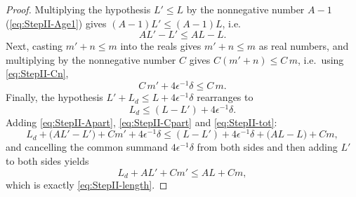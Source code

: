 \begin{proof}
  Multiplying the hypothesis $L'\le L$ by the nonnegative number $A-1$
  (\eqref{eq:StepII-Age1}) gives $(A-1)L' \le (A-1)L$, i.e.
  \begin{equation}
    \label{eq:StepII-Apart}
    A L' - L' \le A L - L
    .
  \end{equation}
  Next, casting $m'+n\le m$ into the reals gives $m'+n \le m$ as real numbers, and multiplying by
  the nonnegative number $C$ gives $C(m'+n) \le C\,m$, i.e.\ using \eqref{eq:StepII-Cn},
  \begin{equation}
    \label{eq:StepII-Cpart}
    C\,m' + 4\epsilon^{-1}\delta \le C\,m
    .
  \end{equation}
  Finally, the hypothesis $L'+L_d \le L + 4\epsilon^{-1}\delta$ rearranges to
  \begin{equation}
    \label{eq:StepII-tot}
    L_d \le (L - L') + 4\epsilon^{-1}\delta
    .
  \end{equation}
  Adding \eqref{eq:StepII-Apart}, \eqref{eq:StepII-Cpart} and \eqref{eq:StepII-tot}:
  \[
    L_d + \bigl(A L' - L'\bigr) + C m' + 4\epsilon^{-1}\delta
      \le (L-L') + 4\epsilon^{-1}\delta + \bigl(A L - L\bigr) + C m
    ,
  \]
  and cancelling the common summand $4\epsilon^{-1}\delta$ from both sides and then adding $L'$
  to both sides yields
  \[
    L_d + A L' + C m' \le A L + C m
    ,
  \]
  which is exactly \eqref{eq:StepII-length}.
\end{proof}
